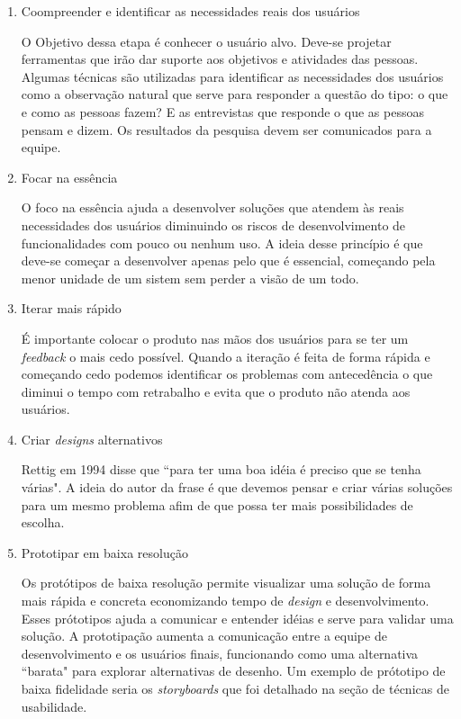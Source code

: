\begin{enumerate}

\item Coompreender e identificar as necessidades reais dos usuários

O Objetivo dessa etapa é conhecer o usuário alvo. Deve-se projetar ferramentas que irão dar suporte aos objetivos e atividades das pessoas.
%
Algumas técnicas são utilizadas para identificar as necessidades dos usuários como a observação natural que serve para responder a questão do tipo: o que e como as pessoas fazem? E as entrevistas que responde o que as pessoas pensam e dizem. Os resultados da pesquisa devem ser comunicados para a equipe.

\item Focar na essência

O foco na essência ajuda a desenvolver soluções que atendem às reais necessidades dos usuários diminuindo os riscos de desenvolvimento de funcionalidades com pouco ou nenhum uso.
%
A ideia desse princípio é que deve-se começar a desenvolver apenas pelo que é essencial, começando pela menor unidade de um sistem sem perder a visão de um todo.

\item Iterar mais rápido

	É importante colocar o produto nas mãos dos usuários para se ter um \textit{feedback} o mais cedo possível. Quando a iteração é feita de forma rápida e começando cedo podemos identificar os problemas com antecedência o que diminui o tempo com retrabalho e evita que o produto não atenda aos usuários.
	

\item Criar \emph{designs} alternativos

	Rettig em 1994 disse que ``para ter uma boa idéia é preciso que se tenha várias". A ideia do autor da frase é que devemos pensar e criar várias soluções para um mesmo problema afim de que possa ter mais possibilidades de escolha. 


\item Prototipar em baixa resolução

Os protótipos de baixa resolução permite visualizar uma solução de forma mais rápida e concreta economizando tempo de \emph{design} e desenvolvimento. Esses prótotipos ajuda a comunicar e entender idéias e serve para validar uma solução. 
%
A prototipação aumenta a comunicação entre a equipe de desenvolvimento e os usuários finais, funcionando como uma alternativa ``barata" para explorar alternativas de desenho. Um exemplo de prótotipo de baixa fidelidade seria os \emph{storyboards} que foi detalhado na seção de técnicas de usabilidade.
	

\end{enumerate}
